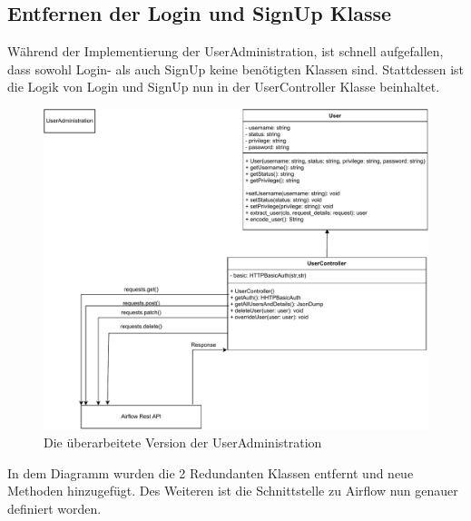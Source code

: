 \subsection{Entfernen der Login und SignUp Klasse}
Während der Implementierung der UserAdministration, ist schnell aufgefallen, dass sowohl Login- als auch SignUp keine benötigten Klassen sind.
Stattdessen ist die Logik von Login und SignUp nun in der UserController Klasse beinhaltet.

\begin{figure}[h]
            \label{UserAdministration}
            \centerline{\includegraphics[scale=0.7]{res/UserAdministration.pdf}}
            \caption{Die überarbeitete Version der UserAdministration}
\end{figure}

In dem Diagramm wurden die 2 Redundanten Klassen entfernt und neue Methoden hinzugefügt. Des Weiteren ist die Schnittstelle zu Airflow nun genauer definiert worden.